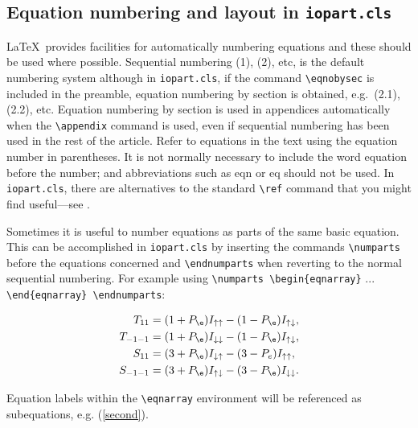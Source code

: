 \documentclass[12pt]{iopart}
\begin{document}
\subsection{Equation numbering and layout in {\tt iopart.cls}}
\label{eqnum}
\LaTeX\ provides facilities for automatically numbering equations 
and these should be used where possible. Sequential numbering (1), (2), 
etc, is the default numbering system although in \verb"iopart.cls", if the command
\verb"\eqnobysec" is included in the preamble, equation numbering
by section is obtained, e.g.\ 
(2.1), (2.2), etc. Equation numbering by section is used in appendices automatically when the \verb"\appendix" command is used, even if sequential numbering has been used in the rest of the article. 
Refer to equations in the text using the equation number in parentheses. It is not normally necessary to include the word equation before the number; and abbreviations such as eqn or eq should not be used.
In \verb"iopart.cls", there are alternatives to the standard \verb"\ref" command that you might
find useful---see \tref{abrefs}.

Sometimes it is useful to number equations as parts of the same
basic equation. This can be accomplished in \verb"iopart.cls" by inserting the 
commands \verb"\numparts" before the equations concerned and 
\verb"\endnumparts" when reverting to the normal sequential numbering.
For example using \verb"\numparts \begin{eqnarray}" ... \verb"\end{eqnarray} \endnumparts":

\numparts
\begin{eqnarray}
T_{11}&=(1+P_\e)I_{\uparrow\uparrow}-(1-P_\e)
I_{\uparrow\downarrow},\label{second}\\
T_{-1-1}&=(1+P_\e)I_{\downarrow\downarrow}-(1-P_\e)I_{\uparrow\downarrow},\\
S_{11}&=(3+P_\e)I_{\downarrow\uparrow}-(3-P_e)I_{\uparrow\uparrow},\\
S_{-1-1}&=(3+P_\e)I_{\uparrow\downarrow}-(3-P_\e)
I_{\downarrow\downarrow}.
\end{eqnarray}
\endnumparts

Equation labels within the \verb"\eqnarray" environment will be referenced
as subequations, e.g. (\ref{second}).
\end{document}
